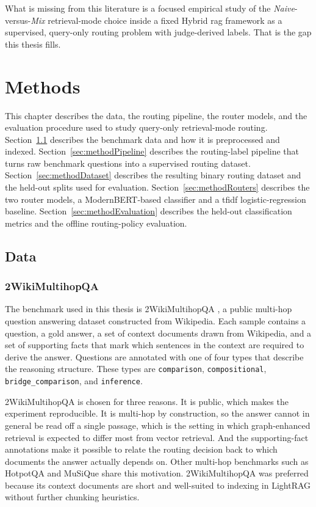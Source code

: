 \documentclass[english, bibtex]{kththesis}               %
\numberwithin{listing}{chapter}
\begin{document}
What is missing from this literature is a focused empirical study of the \emph{Naive}-versus-\emph{Mix} retrieval-mode choice inside a fixed Hybrid \gls{rag} framework as a supervised, query-only routing problem with judge-derived labels. That is the gap this thesis fills.

\cleardoublepage
\chapter{Methods}
\label{ch:methods}

This chapter describes the data, the routing pipeline, the router models, and the evaluation procedure used to study query-only retrieval-mode routing. Section~\ref{sec:methodData} describes the benchmark data and how it is preprocessed and indexed. Section~\ref{sec:methodPipeline} describes the routing-label pipeline that turns raw benchmark questions into a supervised routing dataset. Section~\ref{sec:methodDataset} describes the resulting binary routing dataset and the held-out splits used for evaluation. Section~\ref{sec:methodRouters} describes the two router models, a ModernBERT-based classifier and a \gls{tfidf} logistic-regression baseline. Section~\ref{sec:methodEvaluation} describes the held-out classification metrics and the offline routing-policy evaluation.

\section{Data}
\label{sec:methodData}

\subsection{2WikiMultihopQA}
\label{sec:method2wiki}

The benchmark used in this thesis is 2WikiMultihopQA \cite{ho2020twowiki}, a public multi-hop question answering dataset constructed from Wikipedia. Each sample contains a question, a gold answer, a set of context documents drawn from Wikipedia, and a set of supporting facts that mark which sentences in the context are required to derive the answer. Questions are annotated with one of four types that describe the reasoning structure. These types are \texttt{comparison}, \texttt{compositional}, \texttt{bridge\_comparison}, and \texttt{inference}.

2WikiMultihopQA is chosen for three reasons. It is public, which makes the experiment reproducible. It is multi-hop by construction, so the answer cannot in general be read off a single passage, which is the setting in which graph-enhanced retrieval is expected to differ most from vector retrieval. And the supporting-fact annotations make it possible to relate the routing decision back to which documents the answer actually depends on. Other multi-hop benchmarks such as HotpotQA and MuSiQue \cite{yang2018hotpotqa,trivedi2022musique} share this motivation. 2WikiMultihopQA was preferred because its context documents are short and well-suited to indexing in LightRAG without further chunking heuristics.
\end{document}
